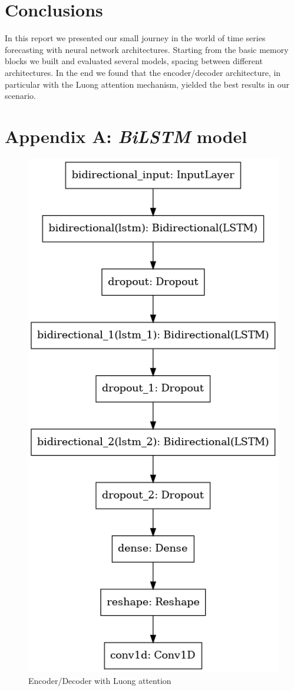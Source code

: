 \documentclass[10.5pt,a4paper,twocolumn]{article}
\begin{document}
\section{Conclusions}
In this report we presented our small journey in the world of time series forecasting with 
neural network architectures. Starting from the basic memory blocks we built and evaluated 
several models, spacing between different architectures.
In the end we found that the encoder/decoder architecture, in particular
with the Luong attention mechanism, yielded the best results in our scenario.\\

\newpage
\section*{Appendix A: \textit{BiLSTM} model}
\begin{figure}[h]
    \centering
    \includegraphics[width=0.8\linewidth]{pics/bilstm_model.png}
    \caption{Encoder/Decoder with Luong attention}
\end{figure}
\vfill\break
\end{document}

